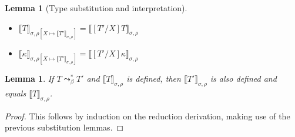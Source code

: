 \documentclass{article}
\newcommand{\interp}[1]{\llbracket #1 \rrbracket}
\newtheorem{lemma}[theorem]{Lemma}
\begin{document}
\begin{lemma}[Type substitution and interpretation] 
\label{lem:tpsubstinterp}
\begin{itemize}
\item $\interp{T}_{\sigma,\rho[X\mapsto\interp{T'}_{\sigma,\rho}]} = \interp{[T'/X]T}_{\sigma,\rho}$
\item $\interp{\kappa}_{\sigma,\rho[X\mapsto\interp{T'}_{\sigma,\rho}]} = \interp{[T'/X]\kappa}_{\sigma,\rho}$
\end{itemize}
\end{lemma}

\begin{lemma}
  \label{lem:interppres}
  If $T \leadsto^*_{\beta} T'$ and $\interp{T}_{\sigma,\rho}$ is defined, then $\interp{T'}_{\sigma,\rho}$ is also defined and equals $\interp{T}_{\sigma,\rho}$.
\end{lemma}
\begin{proof}
  This follows by induction on the reduction derivation, making use of the previous substitution lemmas.
  \end{proof}
\end{document}
